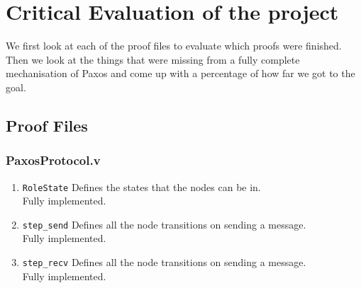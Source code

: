 \vspace{-5mm}
\section{Critical Evaluation of the project}
We first look at each of the proof files to evaluate which proofs
were finished. Then we look at the things that were missing from a fully
complete mechanisation of Paxos and come up with a percentage of how far we
got to the goal.

\subsection{Proof Files}

\subsubsection{PaxosProtocol.v}
\begin{enumerate}
  \item \texttt{RoleState}
  Defines the states that the nodes can be in. \\
  Fully implemented.
  \item \texttt{step\_send}
  Defines all the node transitions on sending a message. \\
  Fully implemented.
  \item \texttt{step\_recv}
  Defines all the node transitions on sending a message. \\
  Fully implemented.
\end{enumerate}

\vspace{-5mm}
